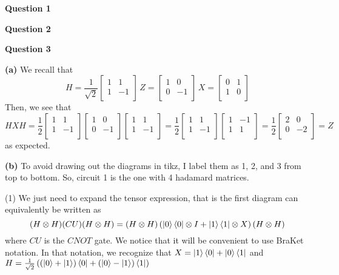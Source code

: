 \documentclass[10pt]{article}
\begin{document}
\textbf{Question 1}

\textbf{Question 2}

\textbf{Question 3}

\textbf{(a)} We recall that
\[ H = \frac{1}{\sqrt{2}}
\begin{bmatrix}
  1 & 1 \\
  1 & -1 \\
\end{bmatrix}
\,
Z = 
\begin{bmatrix}
  1 & 0 \\
  0 & -1 \\
\end{bmatrix}
\,
X =
\begin{bmatrix}
  0 & 1 \\
  1 & 0 \\
\end{bmatrix}
\]
Then, we see that
\[ HXH = \frac{1}{2}
\begin{bmatrix}
  1 & 1 \\
  1 & -1 \\
\end{bmatrix}
\begin{bmatrix}
  1 & 0 \\
  0 & -1 \\
\end{bmatrix}
\begin{bmatrix}
  1 & 1 \\
  1 & -1 \\
\end{bmatrix}
= \frac{1}{2}
\begin{bmatrix}
  1 & 1 \\
  1 & -1 \\
\end{bmatrix}
\begin{bmatrix}
  1 & -1 \\
  1 & 1 \\
\end{bmatrix}
=
\frac{1}{2}
\begin{bmatrix}
  2 & 0 \\
  0 & -2 \\
\end{bmatrix}
= Z \]
as expected.

\textbf{(b)}
To avoid drawing out the diagrams in tikz, I label them as 1, 2, and 3 from top to bottom. So, circuit 1 is the one with 4 hadamard matrices.

(1) We just need to expand the tensor expression, that is the first diagram can equivalently be written as
\[ (H \otimes H)(CU)(H \otimes H) = (H \otimes H)\left(\ket{0}\bra{0}\otimes I + \ket{1}\bra{1}\otimes X\right)(H\otimes H) \]
where $CU$ is the $CNOT$ gate. We notice that it will be convenient to use BraKet notation. In that notation, we recognize that $X = \ket{1}\bra{0} + \ket{0}\bra{1}$ and $H = \frac{1}{\sqrt{2}}\left((\ket{0} + \ket{1})\bra{0} + (\ket{0} - \ket{1})\bra{1}\right)$
\end{document}
